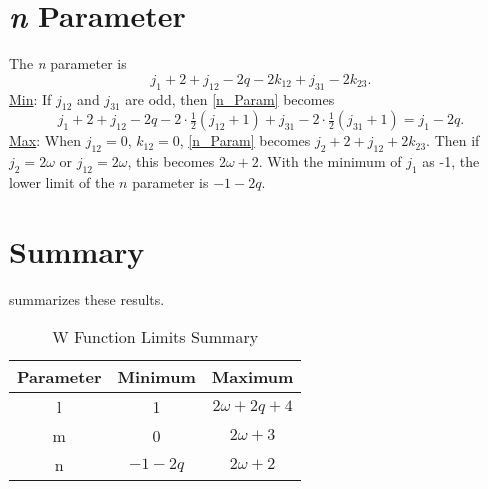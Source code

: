 \documentclass[Dissertation.tex]{subfiles}
\begin{document}
\section{\emph{n} Parameter}
The \emph{n} parameter is
\begin{equation}
	\label{n_Param}j_1 + 2 + j_{12} - 2 q - 2 k_{12} + j_{31} - 2 k_{23}.
\end{equation}
\underline{Min}: If $j_{12}$ and $j_{31}$ are odd, then \cref{n_Param} becomes
	\begin{equation}
	j_1 + 2 + j_{12} - 2q - 2\cdot\tfrac{1}{2}(j_{12}+1) + j_{31} - 2\cdot\tfrac{1}{2}(j_{31}+1) = j_1 - 2q.
	\end{equation}
\underline{Max}: When $j_{12} = 0$, $k_{12} = 0$, \cref{n_Param} becomes
$j_2 + 2 + j_{12} + 2k_{23}$. Then if $j_2 = 2\omega$ or $j_{12} = 2\omega$,
this becomes $2\omega + 2$.  With the minimum of $j_1$ as -1, the lower limit
of the $n$ parameter is $-1 - 2q$.

\section{Summary}
 summarizes these results.

\begin{table}[H]
\centering
\begin{tabular}{c c c}
\toprule
Parameter & Minimum & Maximum \\
\midrule
  l & 1 & $2\omega + 2q + 4$ \\
  m & 0 & $2\omega + 3$ \\
  n	& $-1 - 2q$ & $2\omega + 2$ \\
\bottomrule
\end{tabular}
\caption{W Function Limits Summary}
\label{tab:WLimits}
\end{table}




\biblio
\end{document}
